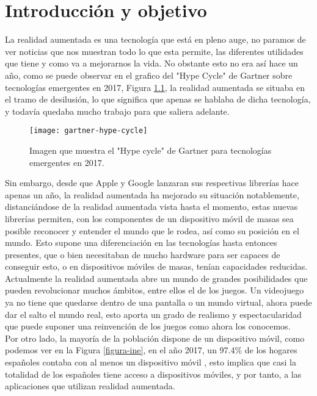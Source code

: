 \chapter{Introducción y objetivo}
\label{ch:introduccion}

La realidad aumentada es una tecnología que está en pleno auge, no paramos de ver noticias que nos muestran todo lo que esta permite, las diferentes utilidades que tiene y como va a mejorarnos la vida. No obstante esto no era así hace un año, como se puede observar en el grafico del "Hype Cycle" de Gartner sobre tecnologías emergentes en 2017, Figura \ref{figura-gartner}, la realidad aumentada se situaba en el tramo de desilusión, lo que significa que apenas se hablaba de dicha tecnología, y todavía quedaba mucho trabajo para que saliera adelante.\\

\begin{figure}[h]
  \centering
  \texttt{[image: gartner-hype-cycle]}
  \caption{Imagen que muestra el "Hype cycle" de Gartner para tecnologías emergentes en 2017.\protect\footnotemark}
  \label{figura-gartner}
\end{figure}


Sin embargo, desde que Apple y Google lanzaran sus respectivas librerías hace apenas un año, la realidad aumentada ha mejorado su situación notablemente, distanciándose de la realidad aumentada vista hasta el momento, estas nuevas librerías permiten, con los componentes de un dispositivo móvil de masas sea posible reconocer y entender el mundo que le rodea, así como su posición en el mundo. Esto supone una diferenciación en las tecnologías hasta entonces presentes, que o bien necesitaban de mucho hardware para ser capaces de conseguir esto, o en dispositivos móviles de masas, tenían capacidades reducidas.\\

Actualmente la realidad aumentada abre un mundo de grandes posibilidades que pueden revolucionar muchos ámbitos, entre ellos el de los juegos. Un videojuego ya no tiene que quedarse dentro de una pantalla o un mundo virtual, ahora puede dar el salto el mundo real, esto aporta un grado de realismo y espectacularidad que puede suponer una reinvención de los juegos como ahora los conocemos.\\

Por otro lado, la mayoría de la población dispone de un dispositivo móvil, como podemos ver en la Figura \ref{figura-ine}, en el año 2017, un 97.4\% de los hogares españoles contaba con al menos un dispositivo móvil \cite{ine}, esto implica que casi la totalidad de los españoles tiene acceso a dispositivos móviles, y por tanto, a las aplicaciones que utilizan realidad aumentada.

